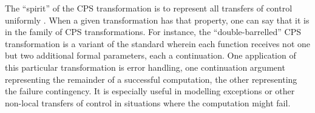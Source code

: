 \documentclass[ms]{byuprop}
\begin{document}
The ``spirit'' of the CPS transformation is to represent all transfers of control 
uniformly \cite{sabry1994formal}. When a given transformation has that property, one can 
say that it is in the family of CPS transformations. For instance, the ``double-barrelled'' 
CPS transformation is a variant of the standard wherein each function receives not one but 
two additional formal parameters, each a continuation. One application of this particular 
transformation is error handling, one continuation argument representing the remainder of 
a successful computation, the other representing the failure contingency. It is especially 
useful in modelling exceptions or other non-local transfers of control in situations where 
the computation might fail.








\end{document}
